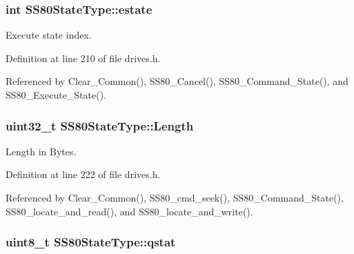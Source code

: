 \subsubsection[{\texorpdfstring{estate}{estate}}]{\setlength{\rightskip}{0pt plus 5cm}int S\+S80\+State\+Type\+::estate}\hypertarget{structSS80StateType_ae4a94143cb4201687be4e33684be057e}{}\label{structSS80StateType_ae4a94143cb4201687be4e33684be057e}


Execute state index. 



Definition at line 210 of file drives.\+h.



Referenced by Clear\+\_\+\+Common(), S\+S80\+\_\+\+Cancel(), S\+S80\+\_\+\+Command\+\_\+\+State(), and S\+S80\+\_\+\+Execute\+\_\+\+State().

\subsubsection[{\texorpdfstring{Length}{Length}}]{\setlength{\rightskip}{0pt plus 5cm}uint32\+\_\+t S\+S80\+State\+Type\+::\+Length}\hypertarget{structSS80StateType_a507159f0a0a4f3127488081fd618e8f6}{}\label{structSS80StateType_a507159f0a0a4f3127488081fd618e8f6}


Length in Bytes. 



Definition at line 222 of file drives.\+h.



Referenced by Clear\+\_\+\+Common(), S\+S80\+\_\+cmd\+\_\+seek(), S\+S80\+\_\+\+Command\+\_\+\+State(), S\+S80\+\_\+locate\+\_\+and\+\_\+read(), and S\+S80\+\_\+locate\+\_\+and\+\_\+write().

\subsubsection[{\texorpdfstring{qstat}{qstat}}]{\setlength{\rightskip}{0pt plus 5cm}uint8\+\_\+t S\+S80\+State\+Type\+::qstat}\hypertarget{structSS80StateType_ad4911c7b89ec1ff2c0aa01881b1e3d3a}{}\label{structSS80StateType_ad4911c7b89ec1ff2c0aa01881b1e3d3a}


